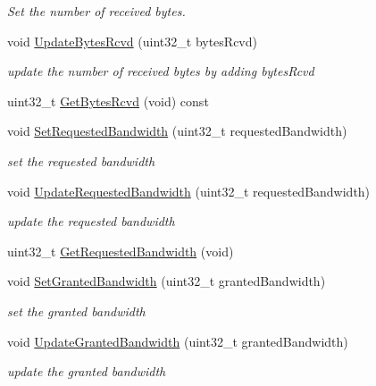 \begin{DoxyCompactItemize}
\begin{DoxyCompactList}\small\item\em Set the number of received bytes. \end{DoxyCompactList}\item 
void \hyperlink{classns3_1_1ServiceFlowRecord_a1c2645c032b8862421638cf723383022}{Update\+Bytes\+Rcvd} (uint32\+\_\+t bytes\+Rcvd)
\begin{DoxyCompactList}\small\item\em update the number of received bytes by adding bytes\+Rcvd \end{DoxyCompactList}\item 
uint32\+\_\+t \hyperlink{classns3_1_1ServiceFlowRecord_aafff618f633ae1e445f6d54a3b035ac6}{Get\+Bytes\+Rcvd} (void) const 
\item 
void \hyperlink{classns3_1_1ServiceFlowRecord_a53f324ee496db8928fee7371ffde7014}{Set\+Requested\+Bandwidth} (uint32\+\_\+t requested\+Bandwidth)
\begin{DoxyCompactList}\small\item\em set the requested bandwidth \end{DoxyCompactList}\item 
void \hyperlink{classns3_1_1ServiceFlowRecord_a11a71e7d127b09d826aba3cad83e78ac}{Update\+Requested\+Bandwidth} (uint32\+\_\+t requested\+Bandwidth)
\begin{DoxyCompactList}\small\item\em update the requested bandwidth \end{DoxyCompactList}\item 
uint32\+\_\+t \hyperlink{classns3_1_1ServiceFlowRecord_a350b3e9bbb313f63c52b6803b1f0761b}{Get\+Requested\+Bandwidth} (void)
\item 
void \hyperlink{classns3_1_1ServiceFlowRecord_ae10f3c5af2cea59c522828689d38f63b}{Set\+Granted\+Bandwidth} (uint32\+\_\+t granted\+Bandwidth)
\begin{DoxyCompactList}\small\item\em set the granted bandwidth \end{DoxyCompactList}\item 
void \hyperlink{classns3_1_1ServiceFlowRecord_abf6fe590f6bfe9321a41e1659cd65267}{Update\+Granted\+Bandwidth} (uint32\+\_\+t granted\+Bandwidth)
\begin{DoxyCompactList}\small\item\em update the granted bandwidth \end{DoxyCompactList}\item 

\end{DoxyCompactItemize}
